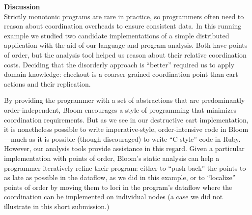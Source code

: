 \noindent
\textbf{Discussion}\\
\noindent
Strictly monotonic programs
are rare in practice, so programmers often need to reason about coordination overheads to ensure consistent data.  In this running example we studied
two candidate implementations of a simple distributed application with the aid of
our language and program analysis. Both have points of order, but the analysis tool helped us reason about their relative coordination costs.  Deciding that the disorderly
approach is ``better'' required us to apply domain knowledge: checkout is a coarser-grained coordination point than cart actions and their replication.

By providing the programmer with a set of abstractions that are predominantly
order-independent, Bloom encourages a style of programming that minimizes
coordination requirements.  But as we see in our destructive cart
implementation, it is nonetheless possible to write imperative-style,
order-intensive code in Bloom---much as it is possible (though discouraged) to
write ``C-style'' code in Ruby.  However, our analysis tools provide assistance
in this regard.  Given a particular implementation with points of order,
Bloom's static analysis can help a programmer iteratively refine their program:
either to ``push back'' the points to as late as possible in the dataflow, as
we did in this example, or to ``localize'' points of order by moving them to
loci in the program's dataflow where the coordination can be implemented on
individual nodes (a case we did not illustrate in this short submission.)
